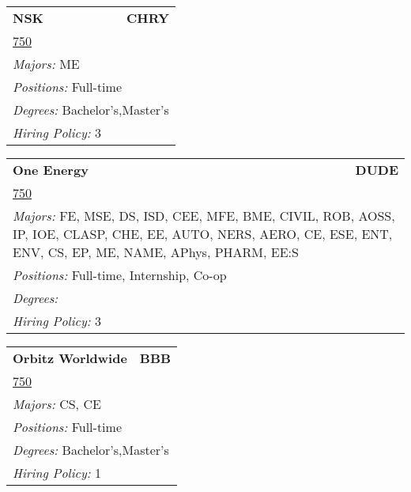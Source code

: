 \documentclass[twoside]{article}
\begin{document}
\begin{center}
\begin{multicols}{3}
\begin{FlushLeft}
\begin{minipage}{.9\columnwidth}\begin{tabularx}{.95\columnwidth}{Xr}
                 {\Large\bf NSK} & {\Large\bf CHRY}\\
    \multicolumn{2}{p{.95\columnwidth}}{\url{750}}\\
    \multicolumn{2}{p{.95\columnwidth}}{\emph{Majors:} ME}\\
    \multicolumn{2}{p{.95\columnwidth}}{\emph{Positions:} Full-time}\\
    \multicolumn{2}{p{.95\columnwidth}}{\emph{Degrees:} Bachelor's,Master's}\\
    \multicolumn{2}{p{.95\columnwidth}}{\emph{Hiring Policy:} 3}\\
    \end{tabularx}
    
\end{minipage}
 
\begin{minipage}{.9\columnwidth}\begin{tabularx}{.95\columnwidth}{Xr}
                 {\Large\bf One Energy} & {\Large\bf DUDE}\\
    \multicolumn{2}{p{.95\columnwidth}}{\url{750}}\\
    \multicolumn{2}{p{.95\columnwidth}}{\emph{Majors:} FE, MSE, DS, ISD, CEE, MFE, BME, CIVIL, ROB, AOSS, IP, IOE, CLASP, CHE, EE, AUTO, NERS, AERO, CE, ESE, ENT, ENV, CS, EP, ME, NAME, APhys, PHARM, EE:S}\\
    \multicolumn{2}{p{.95\columnwidth}}{\emph{Positions:} Full-time, Internship, Co-op}\\
    \multicolumn{2}{p{.95\columnwidth}}{\emph{Degrees:} }\\
    \multicolumn{2}{p{.95\columnwidth}}{\emph{Hiring Policy:} 3}\\
    \end{tabularx}
    
\end{minipage}
 
\begin{minipage}{.9\columnwidth}\begin{tabularx}{.95\columnwidth}{Xr}
                 {\Large\bf Orbitz Worldwide} & {\Large\bf BBB}\\
    \multicolumn{2}{p{.95\columnwidth}}{\url{750}}\\
    \multicolumn{2}{p{.95\columnwidth}}{\emph{Majors:} CS, CE}\\
    \multicolumn{2}{p{.95\columnwidth}}{\emph{Positions:} Full-time}\\
    \multicolumn{2}{p{.95\columnwidth}}{\emph{Degrees:} Bachelor's,Master's}\\
    \multicolumn{2}{p{.95\columnwidth}}{\emph{Hiring Policy:} 1}\\
    \end{tabularx}
    

\end{minipage}
\end{FlushLeft}
\end{multicols}
\end{center}
\end{document}
